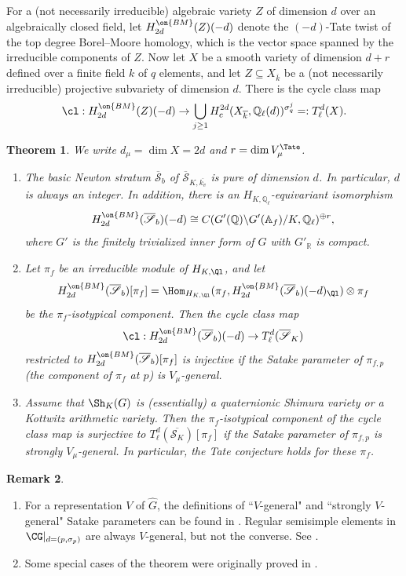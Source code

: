 \documentclass[11pt]{amsart}
\newtheorem{thm}{Theorem}[subsection]
\theoremstyle{definition}
\theoremstyle{definition}
\newtheorem{rmk}[thm]{Remark}
\theoremstyle{definition}
\numberwithin{equation}{section}
\newcommand{\bA}{{\mathbb A}}
\newcommand{\bQ}{{\mathbb Q}}
\newcommand{\bR}{{\mathbb R}}
\newcommand{\scrS}{{\mathscr S}}
\begin{document}
For a (not necessarily irreducible) algebraic variety $Z$ of dimension $d$ over an algebraically closed field, let $H^{\on{BM}}_{2d}(Z)(-d)$ denote the $(-d)$-Tate twist of the top degree Borel--Moore homology, which is the vector space spanned by the irreducible components of $Z$. Now let $X$ be
a smooth variety of dimension $d+r$ defined over a finite field $k$ of $q$ elements, and let $Z \subseteq X_{\overline k}$ be a (not necessarily irreducible) projective subvariety of dimension $d$. There is the cycle class map
\[
\cl: H^{\on{BM}}_{2d}(Z)(-d)\to \bigcup_{j\geq 1}H_{c}^{2d}(X_{\overline k}, \bQ_\ell(d))^{\sigma_q^j}=:T^d_\ell(X).
\]
\begin{thm}
\label{T:main theorem}
We write $d_{\mu}=\dim X=2d$ and $r=\dim V_\mu^{\Tate}$.
\begin{enumerate}
\item\label{T:main theorem-1} The basic Newton stratum $\overline{\mathscr S}_b$ of $\overline{\scrS}_{K,\overline{k_v}}$ is pure of dimension $d$. In particular, $d$ is always an integer. In addition,
there is an $H_{K,\bQ_\ell}$-equivariant isomorphism
\[
H^{\on{BM}}_{2d}(\overline{\mathscr S}_{b})(-d)\cong C(G'(\bQ)\backslash G'(\bA_f)/K,\bQ_\ell)^{\oplus r},
\]
where $G'$ is the finitely trivialized inner form of $G$ with $G'_\bR$ is compact.
\item\label{T:main theorem-2}
Let $\pi_f$ be an irreducible module of $H_{K,\Ql}$, and let 
\[
H^{\on{BM}}_{2d}(\overline{\mathscr S}_{b})[\pi_f]=\Hom_{H_{K,\Ql}}(\pi_f,H^{\on{BM}}_{2d}(\overline{\mathscr S}_{b})(-d)_{\Ql})\otimes \pi_f
\] 
be the $\pi_f$-isotypical component. Then the cycle class map
\[
\cl:H^{\on{BM}}_{2d}(\overline{\mathscr S}_{b})(-d)\to T^d_\ell(\overline{\mathscr S}_{K})
\]
restricted to $H^{\on{BM}}_{2d}(\overline{\mathscr S}_{b})[\pi_f]$ is injective if the Satake parameter of $\pi_{f,p}$ (the component of $\pi_f$ at $p$) is $V_\mu$-general.
\item\label{T:main theorem-3} 
Assume that $\Sh_K(G)$ is (essentially) a quaternionic Shimura variety or a Kottwitz arithmetic variety. Then the $\pi_f$-isotypical component of the cycle class map is surjective to $T^d_\ell(\overline{\scrS_K})[\pi_f]$ if the Satake parameter of $\pi_{f,p}$ is strongly $V_\mu$-general. In particular, the Tate conjecture holds for these $\pi_f$.
\end{enumerate}
\end{thm}
\begin{rmk}
\begin{enumerate}
\item For a representation $V$ of $\hat G$, the definitions of ``$V$-general" and ``strongly $V$-general" Satake parameters can be found in \cite[Definition 1.4.2]{Xiao-Zhu-Cycle}. Regular semisimple elements in $\CG|_{d=(p,\sigma_p)}$ are always $V$-general, but not the converse. See \cite[Remark 1.4.3]{Xiao-Zhu-Cycle}.
\item Some special cases of the theorem were originally proved in \cite{Helm-Tian-Xiao,Tian-Xiao-Tate}.
\end{enumerate}
\end{rmk}
\end{document}
